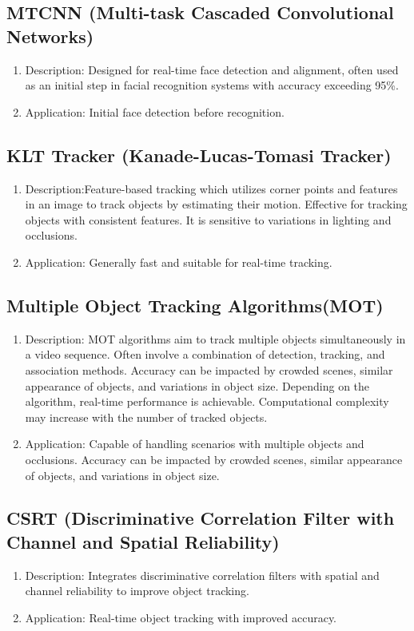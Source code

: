 \subsection{MTCNN (Multi-task Cascaded Convolutional Networks)}
\begin{enumerate}
\item Description: Designed for real-time face detection and alignment, often used as an initial step in facial recognition systems with accuracy exceeding 95\%.
\item Application: Initial face detection before recognition.
\end{enumerate}

\subsection{KLT Tracker (Kanade-Lucas-Tomasi Tracker)}
\begin{enumerate}
\item Description:Feature-based tracking which utilizes corner points and features in an image to track objects by estimating their motion.
Effective for tracking objects with consistent features. It is sensitive to variations in lighting and occlusions.
\item Application: Generally fast and suitable for real-time tracking.
\end{enumerate}

\subsection{Multiple Object Tracking Algorithms(MOT)}
\begin{enumerate}
\item Description: MOT algorithms aim to track multiple objects simultaneously in a video sequence. Often involve a combination of detection, tracking, and association methods. Accuracy can be impacted by crowded scenes, similar appearance of objects, and variations in object size. Depending on the algorithm, real-time performance is achievable. Computational complexity may increase with the number of tracked objects.
\item Application: Capable of handling scenarios with multiple objects and occlusions.
Accuracy can be impacted by crowded scenes, similar appearance of objects, and variations in object size.
\end{enumerate}

\subsection{CSRT (Discriminative Correlation Filter with Channel and Spatial Reliability)}
\begin{enumerate}
\item Description: Integrates discriminative correlation filters with spatial and channel reliability to improve object tracking.
\item Application: Real-time object tracking with improved accuracy.
\end{enumerate}
